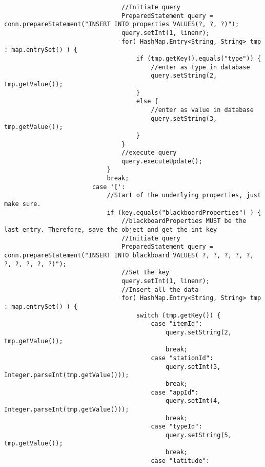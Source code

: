 \begin{lstlisting}
                                //Initiate query
                                PreparedStatement query = conn.prepareStatement("INSERT INTO properties VALUES(?, ?, ?)");
                                query.setInt(1, linenr);
                                for( HashMap.Entry<String, String> tmp : map.entrySet() ) {
                                    if (tmp.getKey().equals("type")) {
                                        //enter as type in database
                                        query.setString(2, tmp.getValue());
                                    }
                                    else {
                                        //enter as value in database
                                        query.setString(3, tmp.getValue());
                                    }
                                }
                                //execute query
                                query.executeUpdate();
                            }
                            break;
                        case '[':
                            //Start of the underlying properties, just make sure.
                            if (key.equals("blackboardProperties") ) {
                                //blackboardProperties MUST be the last entry. Therefore, save the object and get the int key
                                //Initiate query
                                PreparedStatement query = conn.prepareStatement("INSERT INTO blackboard VALUES( ?, ?, ?, ?, ?, ?, ?, ?, ?, ?)");
                                //Set the key
                                query.setInt(1, linenr);
                                //Insert all the data
                                for( HashMap.Entry<String, String> tmp : map.entrySet() ) {
                                    switch (tmp.getKey()) {
                                        case "itemId":
                                            query.setString(2, tmp.getValue());
                                            break;
                                        case "stationId":
                                            query.setInt(3, Integer.parseInt(tmp.getValue()));
                                            break;
                                        case "appId":
                                            query.setInt(4, Integer.parseInt(tmp.getValue()));
                                            break;
                                        case "typeId":
                                            query.setString(5, tmp.getValue());
                                            break;
                                        case "latitude":

\end{lstlisting}
